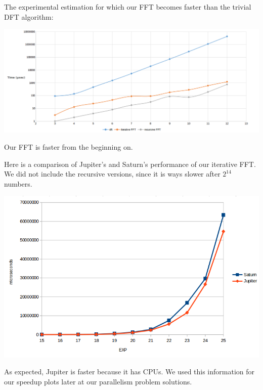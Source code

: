 The experimental estimation for which our FFT becomes faster than the trivial DFT algorithm:
\begin{center}
\includegraphics[width=\textwidth]{dft_comp.png}
\end{center}
Our FFT is faster from the beginning on.

Here is a comparison of Jupiter's and Saturn's performance of our iterative FFT. We did not include the recursive versions, since it is ways slower after \(2^{14}\) numbers.
\begin{center}
\includegraphics[width=\textwidth]{seq_performance.png}
\end{center}
As expected, Jupiter is faster because it has CPUs. We used this information for our speedup plots later at our parallelism problem solutions.